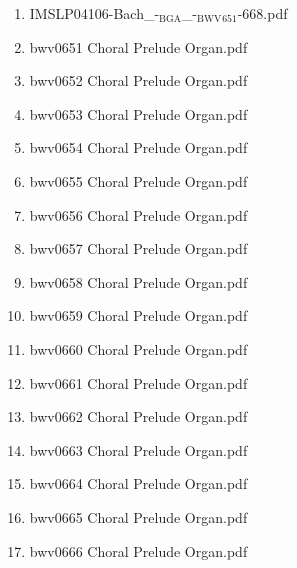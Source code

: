 \documentclass[11pt]{article}
\begin{document}
\begin{enumerate}
\begin{enumerate}
\begin{enumerate}
\begin{enumerate}
\item IMSLP04106-Bach\_-$_{\text{BGA}}$\_-$_{\text{BWV}}$$_{\text{651}}$-668.pdf
\label{sec-1-1-1-1-44-6-4-1-14-2}

\item bwv0651   Choral Prelude Organ.pdf
\label{sec-1-1-1-1-44-6-4-1-14-3}

\item bwv0652   Choral Prelude Organ.pdf
\label{sec-1-1-1-1-44-6-4-1-14-4}

\item bwv0653   Choral Prelude Organ.pdf
\label{sec-1-1-1-1-44-6-4-1-14-5}

\item bwv0654   Choral Prelude Organ.pdf
\label{sec-1-1-1-1-44-6-4-1-14-6}

\item bwv0655   Choral Prelude Organ.pdf
\label{sec-1-1-1-1-44-6-4-1-14-7}

\item bwv0656   Choral Prelude Organ.pdf
\label{sec-1-1-1-1-44-6-4-1-14-8}

\item bwv0657   Choral Prelude Organ.pdf
\label{sec-1-1-1-1-44-6-4-1-14-9}

\item bwv0658   Choral Prelude Organ.pdf
\label{sec-1-1-1-1-44-6-4-1-14-10}

\item bwv0659   Choral Prelude Organ.pdf
\label{sec-1-1-1-1-44-6-4-1-14-11}

\item bwv0660   Choral Prelude Organ.pdf
\label{sec-1-1-1-1-44-6-4-1-14-12}

\item bwv0661   Choral Prelude Organ.pdf
\label{sec-1-1-1-1-44-6-4-1-14-13}

\item bwv0662   Choral Prelude Organ.pdf
\label{sec-1-1-1-1-44-6-4-1-14-14}

\item bwv0663   Choral Prelude Organ.pdf
\label{sec-1-1-1-1-44-6-4-1-14-15}

\item bwv0664   Choral Prelude Organ.pdf
\label{sec-1-1-1-1-44-6-4-1-14-16}

\item bwv0665   Choral Prelude Organ.pdf
\label{sec-1-1-1-1-44-6-4-1-14-17}

\item bwv0666   Choral Prelude Organ.pdf
\label{sec-1-1-1-1-44-6-4-1-14-18}


\end{enumerate}
\end{enumerate}
\end{enumerate}
\end{enumerate}
\end{document}
